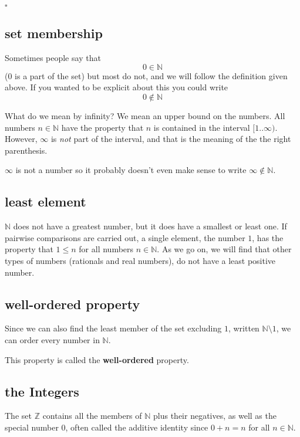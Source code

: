 \documentclass[11pt, oneside]{article}
\begin{document}
$\square$

\subsection*{set membership}

Sometimes people say that
\[ 0 \in \mathbb{N} \]
(0 is a part of the set) but most do not, and we will follow the definition given above.  If you wanted to be explicit about this you could write
\[ 0 \notin \mathbb{N} \]

What do we mean by infinity?  We mean an upper bound on the numbers.  All numbers $n \in \mathbb{N}$ have the property that $n$ is contained in the interval $[1..\infty)$.  However, $\infty$ is \emph{not} part of the interval, and that is the meaning of the the right parenthesis.

$\infty$ is not a number so it probably doesn't even make sense to write $\infty \notin \mathbb{N}$.

\subsection*{least element}

$\mathbb{N}$ does not have a greatest number, but it does have a smallest or least one.  If pairwise comparisons are carried out, a single element, the number $1$, has the property that $1 \le n$ for all numbers $n \in \mathbb{N}$.  As we go on, we will find that other types of numbers (rationals and real numbers), do not have a least positive number.

\subsection*{well-ordered property}

Since we can also find the least member of the set excluding $1$, written $\mathbb{N} \setminus 1$, we can order every number in $\mathbb{N}$.  

This property is called the \textbf{well-ordered} property.

\subsection*{the Integers}

The set $\mathbb{Z}$ contains all the members of $\mathbb{N}$ plus their negatives, as well as the special number $0$, often called the additive identity since $0 + n = n$ for all $n \in \mathbb{N}$.
\end{document}
